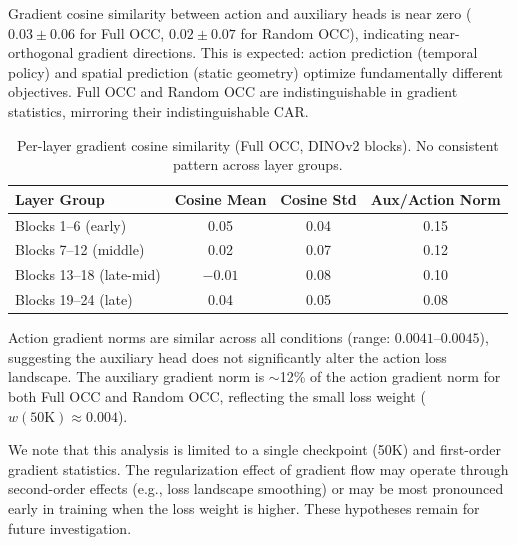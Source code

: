 \documentclass[letterpaper]{article}
\begin{document}
Gradient cosine similarity between action and auxiliary heads is near zero ($0.03 \pm 0.06$ for Full OCC, $0.02 \pm 0.07$ for Random OCC), indicating near-orthogonal gradient directions.
This is expected: action prediction (temporal policy) and spatial prediction (static geometry) optimize fundamentally different objectives.
Full OCC and Random OCC are indistinguishable in gradient statistics, mirroring their indistinguishable CAR.

\begin{table}[h]
\centering
\caption{Per-layer gradient cosine similarity (Full OCC, DINOv2 blocks). No consistent pattern across layer groups.}
\label{tab:gradient_layer}
\small
\begin{tabular}{lccc}
\toprule
\textbf{Layer Group} & \textbf{Cosine Mean} & \textbf{Cosine Std} & \textbf{Aux/Action Norm} \\
\midrule
Blocks 1--6 (early)     & 0.05  & 0.04 & 0.15 \\
Blocks 7--12 (middle)   & 0.02  & 0.07 & 0.12 \\
Blocks 13--18 (late-mid)& $-0.01$ & 0.08 & 0.10 \\
Blocks 19--24 (late)    & 0.04  & 0.05 & 0.08 \\
\bottomrule
\end{tabular}
\end{table}

Action gradient norms are similar across all conditions (range: $0.0041$--$0.0045$), suggesting the auxiliary head does not significantly alter the action loss landscape.
The auxiliary gradient norm is $\sim$12\% of the action gradient norm for both Full OCC and Random OCC, reflecting the small loss weight ($w(50\text{K}) \approx 0.004$).

We note that this analysis is limited to a single checkpoint (50K) and first-order gradient statistics.
The regularization effect of gradient flow may operate through second-order effects (e.g., loss landscape smoothing) or may be most pronounced early in training when the loss weight is higher.
These hypotheses remain for future investigation.




\end{document}
